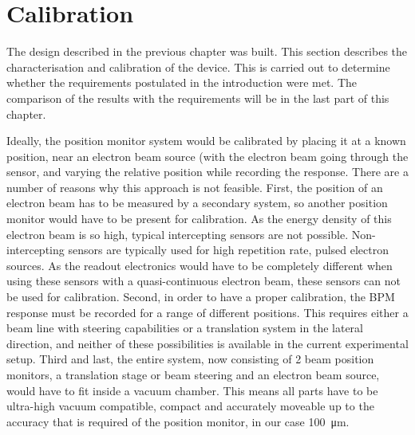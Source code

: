 \chapter{Calibration}
\label{sec:calibration}
The design described in the previous chapter was built. This section describes the characterisation and calibration of the device. This is carried out to determine whether the requirements postulated in the introduction were met. The comparison of the results with the requirements will be in the last part of this chapter.

Ideally, the position monitor system would be calibrated by placing it at a known position, near an electron beam source (with the electron beam going through the sensor, and varying the relative position while recording the response. There are a number of reasons why this approach is not feasible. 
First, the position of an electron beam has to be measured by a secondary system, so another position monitor would have to be present for calibration. As the energy density of this electron beam is so high, typical intercepting sensors are not possible. Non-intercepting sensors are typically used for high repetition rate, pulsed electron sources. As the readout electronics would have to be completely different when using these sensors with a quasi-continuous electron beam, these sensors can not be used for calibration.
Second, in order to have a proper calibration, the BPM response must be recorded for a range of different positions. This requires either a beam line with steering capabilities or a translation system in the lateral direction, and neither of these possibilities is available in the current experimental setup.
Third and last, the entire system, now consisting of 2 beam position monitors, a translation stage or beam steering and an electron beam source, would have to fit inside a vacuum chamber. This means all parts have to be ultra-high vacuum compatible, compact and accurately moveable up to the accuracy that is required of the position monitor, in our case \SI{100}{\micro\meter}.

